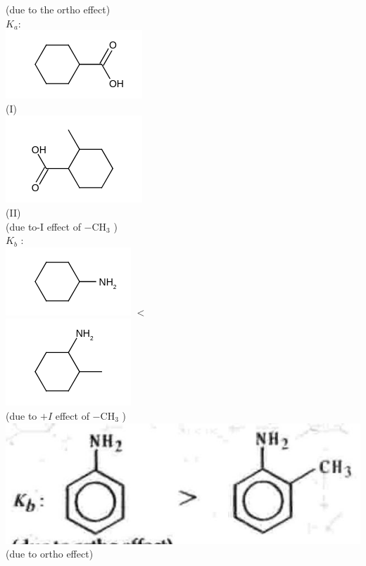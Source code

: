 \documentclass[10pt]{article}
\begin{document}
(due to the ortho effect)\\
$K_{a}:$\\
\includegraphics{smile-e72300fd237acd48c36d89d58ba6a250c1840f54}\\
(I)\\
\includegraphics{smile-d86e33a1577101dca426b653c34947ead67f6064}\\
(II)\\
(due to-I effect of $-\mathrm{CH}_{3}$ )\\
$K_{b}$ :\\
\includegraphics{smile-ddedfc13dc88330454b3d1b02fa7ebe4e1df4a0e} $<$\\
\includegraphics{smile-b38ff08771693af6559bcfbecb36046d76e73bd2}\\
(due to $+I$ effect of $-\mathrm{CH}_{3}$ )\\
\includegraphics[max width=\textwidth, center]{2025_01_28_8470952b98110cec3aabg-163(2)}\\
(due to ortho effect)
\end{document}
